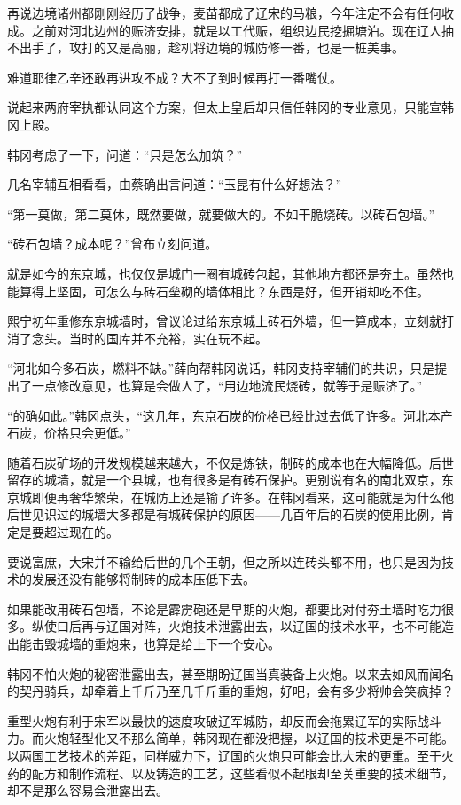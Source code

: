 再说边境诸州都刚刚经历了战争，麦苗都成了辽宋的马粮，今年注定不会有任何收成。之前对河北边州的赈济安排，就是以工代赈，组织边民挖掘塘泊。现在辽人抽不出手了，攻打的又是高丽，趁机将边境的城防修一番，也是一桩美事。

难道耶律乙辛还敢再进攻不成？大不了到时候再打一番嘴仗。

说起来两府宰执都认同这个方案，但太上皇后却只信任韩冈的专业意见，只能宣韩冈上殿。

韩冈考虑了一下，问道：“只是怎么加筑？”

几名宰辅互相看看，由蔡确出言问道：“玉昆有什么好想法？”

“第一莫做，第二莫休，既然要做，就要做大的。不如干脆烧砖。以砖石包墙。”

“砖石包墙？成本呢？”曾布立刻问道。

就是如今的东京城，也仅仅是城门一圈有城砖包起，其他地方都还是夯土。虽然也能算得上坚固，可怎么与砖石垒砌的墙体相比？东西是好，但开销却吃不住。

熙宁初年重修东京城墙时，曾议论过给东京城上砖石外墙，但一算成本，立刻就打消了念头。当时的国库并不充裕，实在玩不起。

“河北如今多石炭，燃料不缺。”薛向帮韩冈说话，韩冈支持宰辅们的共识，只是提出了一点修改意见，也算是会做人了，“用边地流民烧砖，就等于是赈济了。”

“的确如此。”韩冈点头，“这几年，东京石炭的价格已经比过去低了许多。河北本产石炭，价格只会更低。”

随着石炭矿场的开发规模越来越大，不仅是炼铁，制砖的成本也在大幅降低。后世留存的城墙，就是一个县城，也有很多是有砖石保护。更别说有名的南北双京，东京城即便再奢华繁荣，在城防上还是输了许多。在韩冈看来，这可能就是为什么他后世见识过的城墙大多都是有城砖保护的原因——几百年后的石炭的使用比例，肯定是要超过现在的。

要说富庶，大宋并不输给后世的几个王朝，但之所以连砖头都不用，也只是因为技术的发展还没有能够将制砖的成本压低下去。

如果能改用砖石包墙，不论是霹雳砲还是早期的火炮，都要比对付夯土墙时吃力很多。纵使曰后再与辽国对阵，火炮技术泄露出去，以辽国的技术水平，也不可能造出能击毁城墙的重炮来，也算是给上下一个安心。

韩冈不怕火炮的秘密泄露出去，甚至期盼辽国当真装备上火炮。以来去如风而闻名的契丹骑兵，却牵着上千斤乃至几千斤重的重炮，好吧，会有多少将帅会笑疯掉？

重型火炮有利于宋军以最快的速度攻破辽军城防，却反而会拖累辽军的实际战斗力。而火炮轻型化又不那么简单，韩冈现在都没把握，以辽国的技术更是不可能。以两国工艺技术的差距，同样威力下，辽国的火炮只可能会比大宋的更重。至于火药的配方和制作流程、以及铸造的工艺，这些看似不起眼却至关重要的技术细节，却不是那么容易会泄露出去。

